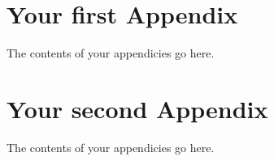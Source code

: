 \begin{appendices}
\chapter{Your first Appendix}
The contents of your appendicies go here.
\chapter{Your second Appendix}
The contents of your appendicies go here.
\end{appendices}
